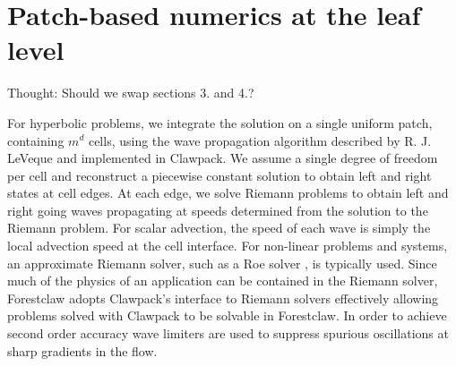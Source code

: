 \documentclass{IOS-Book-Article}     %
\newcommand{\todo}[1]{\textcolor{red}{[TODO: #1]}\xspace}
\newcommand{\clawpack}{{\sc Clawpack}\xspace}
\newcommand{\forestclaw}{Forestclaw\xspace}
\newcommand{\pforest}{\texttt{p4est}\xspace}
\newcommand{\alert}[1]{{\color{red}#1}}
\begin{document}





\section{Patch-based numerics at the leaf level}


\alert{Thought: Should we swap sections 3. and 4.?}

For hyperbolic problems, we integrate the solution on a single uniform patch,
containing $m^d$ cells, using the wave propagation algorithm described by R. J.
LeVeque \cite{LeVeque:1997eg} and implemented in \clawpack \cite{le:2002,
clawpack}.  We assume a single degree of freedom per cell and reconstruct a
piecewise constant solution to obtain left and right states at cell edges.  At
each edge, we solve Riemann problems to obtain left and right going waves
propagating at speeds determined from the solution to the Riemann problem.  For
scalar advection, the speed of each wave is simply the local advection speed at
the cell interface.  For non-linear problems and systems, an approximate
Riemann solver, such as a Roe solver \cite{roesolver}, is typically used.  Since
much of the physics of an application can be contained in the Riemann solver,
\forestclaw adopts \clawpack's interface to Riemann solvers effectively allowing
problems solved with \clawpack to be solvable in \forestclaw.  In order to
achieve second order accuracy wave limiters are used to suppress spurious
oscillations at sharp gradients in the flow.
\end{document}
